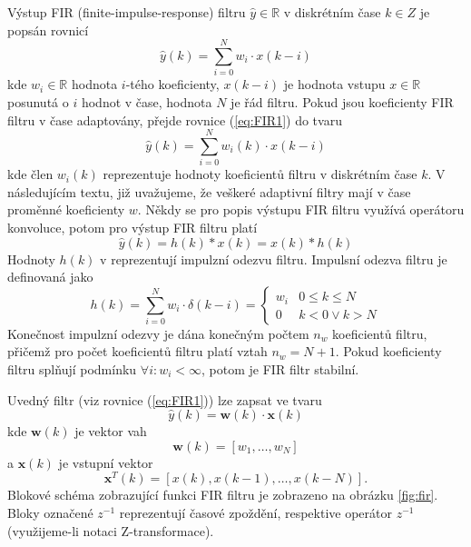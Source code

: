 Výstup FIR (finite-impulse-response) filtru $\hat y \in \mathbb{R}$  v diskrétním čase  $k \in Z$  je popsán rovnicí
\begin{equation}\label{eq:FIR1}
    \hat{y}(k)=\sum_{i=0}^{N}w_i \cdot x(k-i) 
\end{equation}
kde $w_i \in \mathbb{R} $ hodnota $i$-tého koeficienty, $x(k-i) $ je hodnota vstupu $x \in \mathbb{R} $ posunutá o $i$ hodnot v čase, hodnota $N$ je řád filtru. Pokud jsou koeficienty FIR filtru v čase adaptovány, přejde rovnice (\ref{eq:FIR1}) do tvaru
\begin{equation}
    \hat{y}(k)=\sum_{i=0}^{N}w_i(k) \cdot x(k-i) 
\end{equation}
kde člen $w_i(k)$ reprezentuje hodnoty koeficientů filtru v diskrétním čase $k$. V následujícím textu, již uvažujeme, že veškeré adaptivní filtry mají v čase proměnné koeficienty $w$.
Někdy se pro popis výstupu FIR filtru využívá operátoru konvoluce, potom pro výstup FIR filtru platí
\begin{equation}
    \hat{y}(k)= h(k) * x(k)=x(k) * h(k)
\end{equation}
 Hodnoty $h(k)$ v reprezentují impulzní odezvu filtru. Impulsní odezva filtru je definovaná jako
 \begin{equation}
     h(k)=\sum_{i=0}^{N} w_i \cdot \delta(k-i)=
     \begin{cases}
     w_i & 0 \leq k \leq N \\
     0 & k < 0 \lor k > N 
     \end{cases}
 \end{equation}
 Konečnost impulzní odezvy je dána konečným počtem $n_w$ koeficientů filtru, přičemž pro počet koeficientů filtru platí vztah $n_w=N+1$. Pokud koeficienty filtru splňují podmínku $\forall i: w_i < \infty$, potom je FIR filtr stabilní. 
 \par
 Uvedný filtr (viz rovnice (\ref{eq:FIR1})) lze zapsat ve tvaru
 \begin{equation}
     \hat{y}(k)= \textbf{w}(k)\cdot\textbf{x}(k)
 \end{equation}
kde $\textbf{w}(k)$ je vektor vah
\begin{equation}
    \textbf{w}(k)=[w_1,\dots, w_{N}]
\end{equation}
a $\textbf{x}(k)$ je vstupní vektor
\begin{equation}
    \textbf{x}^T(k)=[x(k),x(k-1),\dots,x(k-N)].
\end{equation}
Blokové schéma zobrazující funkci FIR filtru je zobrazeno na obrázku \ref{fig:fir}. Bloky označené $z^{-1}$ reprezentují časové zpoždění, respektive operátor $z^{-1}$ (využijeme-li notaci Z-transformace).


